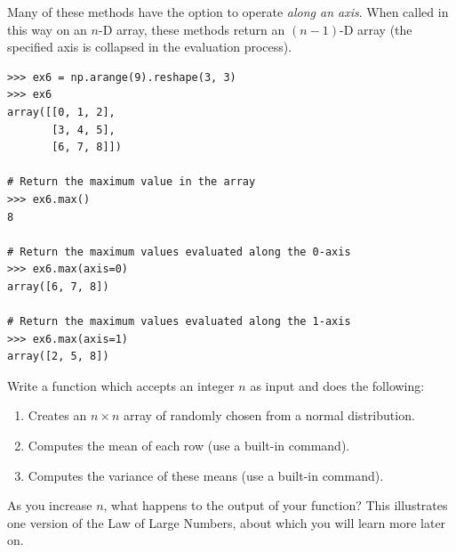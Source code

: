 Many of these methods have the option to operate \emph{along an axis}. 
When called in this way on an $n$-D array, these methods return an $(n-1)$-D array (the specified axis is collapsed in the evaluation process).

\begin{lstlisting}
>>> ex6 = np.arange(9).reshape(3, 3)
>>> ex6
array([[0, 1, 2],
       [3, 4, 5],
       [6, 7, 8]])
       
# Return the maximum value in the array
>>> ex6.max() 
8

# Return the maximum values evaluated along the 0-axis
>>> ex6.max(axis=0)
array([6, 7, 8])

# Return the maximum values evaluated along the 1-axis
>>> ex6.max(axis=1)
array([2, 5, 8])
\end{lstlisting}


\begin{problem}
Write a function which accepts an integer $n$ as input and does the following:
\begin{enumerate}
\item Creates an $n\times n$ array of  randomly chosen from a normal distribution.
\item Computes the mean of each row (use a built-in command).
\item Computes the variance of these means (use a built-in command).
\end{enumerate}
As you increase $n$, what happens to the output of 
your function? This illustrates one version of
the Law of Large Numbers, about which you will learn more later on.
\end{problem}

